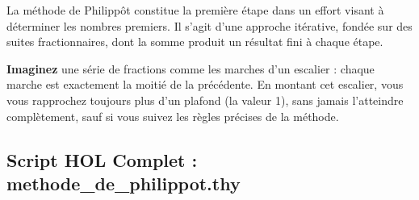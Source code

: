 \documentclass[a4paper,11pt]{article}
\newenvironment{resume}{%
    \begin{tcolorbox}[colback=purple!5,colframe=holpurple,title={\textbf{Résumé visuel}}]
}{%
    \end{tcolorbox}
}
\begin{document}
La méthode de Philippôt constitue la première étape dans un effort visant à déterminer les nombres premiers. Il s'agit d'une approche itérative, fondée sur des suites fractionnaires, dont la somme produit un résultat fini à chaque étape.

\begin{resume}
\textbf{Imaginez} une série de fractions comme les marches d'un escalier : chaque marche est exactement la moitié de la précédente. En montant cet escalier, vous vous rapprochez toujours plus d'un plafond (la valeur 1), sans jamais l'atteindre complètement, sauf si vous suivez les règles précises de la méthode.
\end{resume}

\subsection{Script HOL Complet : methode\_de\_philippot.thy}
\end{document}
